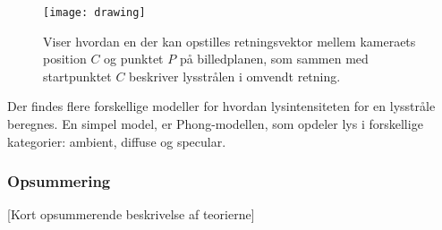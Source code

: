 \begin{figure}[H]
  \label{fig:raytracing_skitse}
  \centering
  \texttt{[image: drawing]}
  \caption{Viser hvordan en der kan opstilles retningsvektor mellem kameraets position $C$ og punktet $P$ på billedplanen, som sammen med startpunktet $C$ beskriver lysstrålen i omvendt retning.}
\end{figure}

Der findes flere forskellige modeller for hvordan lysintensiteten for en lysstråle beregnes. En simpel model, er Phong-modellen, som opdeler lys i forskellige kategorier: ambient, diffuse og specular.


\subsubsection*{Opsummering}

[Kort opsummerende beskrivelse af teorierne]